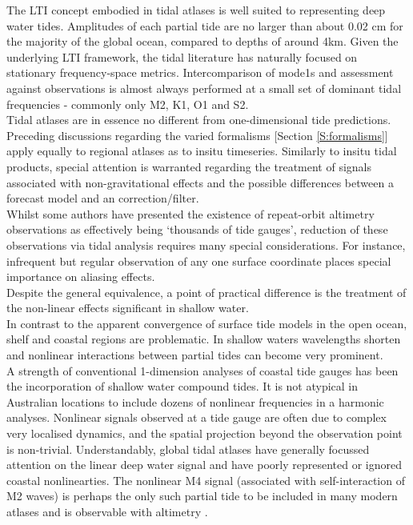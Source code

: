 The LTI concept embodied in tidal atlases is well suited to representing deep water tides.   Amplitudes of each partial tide are no larger than about 0.02 cm for the majority of the global ocean, compared to depths of around 4km.
Given the underlying LTI framework, the tidal literature has naturally focused on stationary frequency-space metrics.  Intercomparison of mode1s and assessment against observations is almost always performed at a small set of dominant tidal frequencies - commonly only M2, K1, O1 and S2.\\
Tidal atlases are in essence no different from one-dimensional tide predictions.   Preceding discussions regarding the varied formalisms [Section \ref{S:formalisms}] apply equally to regional atlases as to insitu timeseries.  Similarly to insitu tidal products, special attention is warranted regarding the treatment of signals associated with non-gravitational effects and the possible differences between a forecast model and an correction/filter.\\



Whilst some authors have presented the existence of repeat-orbit altimetry observations as effectively being `thousands of tide gauges', reduction of these observations via tidal analysis requires many special considerations.  For instance, infrequent but regular observation of any one surface coordinate places special importance on aliasing effects.\\



Despite the general equivalence, a point of practical difference is the treatment of the non-linear effects significant in shallow water.\\
In contrast to the apparent convergence of surface tide models in the open ocean, shelf and coastal regions are problematic.   In shallow waters wavelengths shorten and nonlinear interactions between partial tides can become very prominent.  \\
A strength of conventional 1-dimension analyses of coastal tide gauges has been the incorporation of shallow water compound tides.  It is not atypical in Australian locations to include dozens of nonlinear frequencies in a harmonic analyses.   Nonlinear signals observed at a tide gauge are often due to complex very localised dynamics, and the spatial projection beyond the observation point is non-trivial.  Understandably, global tidal atlases have generally focussed attention on the linear deep water signal and have poorly represented or ignored coastal nonlinearties.  The nonlinear M4 signal (associated with self-interaction of M2 waves) is perhaps the only such partial tide to be included in many modern atlases and is observable with altimetry \cite{Ray:2010jm}.\\



